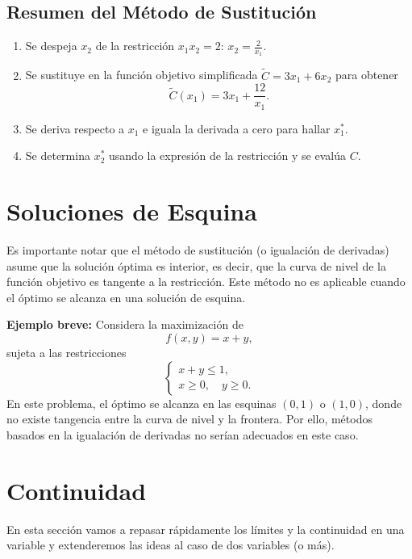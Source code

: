 \documentclass{article}
\begin{document}
\subsection*{Resumen del Método de Sustitución}
\begin{enumerate}
    \item Se despeja \(x_2\) de la restricción \(x_1 x_2 = 2\): \(x_2 = \frac{2}{x_1}\).
    \item Se sustituye en la función objetivo simplificada \(\widetilde{C} = 3x_1 + 6x_2\) para obtener
    \[
    \widetilde{C}(x_1) = 3x_1 + \frac{12}{x_1}.
    \]
    \item Se deriva respecto a \(x_1\) e iguala la derivada a cero para hallar \(x_1^*\).
    \item Se determina \(x_2^*\) usando la expresión de la restricción y se evalúa \(C\).
\end{enumerate}

\section*{Soluciones de Esquina}

Es importante notar que el método de sustitución (o igualación de derivadas) asume que la solución óptima es interior, es decir, que la curva de nivel de la función objetivo es tangente a la restricción. Este método no es aplicable cuando el óptimo se alcanza en una solución de esquina.

\medskip

\textbf{Ejemplo breve:}  
Considera la maximización de
\[
f(x,y)=x+y,
\]
sujeta a las restricciones
\[
\begin{cases}
x+y\leq 1,\\[1mm]
x\geq 0,\quad y\geq 0.
\end{cases}
\]
En este problema, el óptimo se alcanza en las esquinas \((0,1)\) o \((1,0)\), donde no existe tangencia entre la curva de nivel y la frontera. Por ello, métodos basados en la igualación de derivadas no serían adecuados en este caso.




\newpage


\section{Continuidad}


En esta sección vamos a repasar rápidamente los {\color{teal}límites y la continuidad en una variable} y extenderemos las ideas al caso de {\color{teal}dos variables} (o más). 
\end{document}
